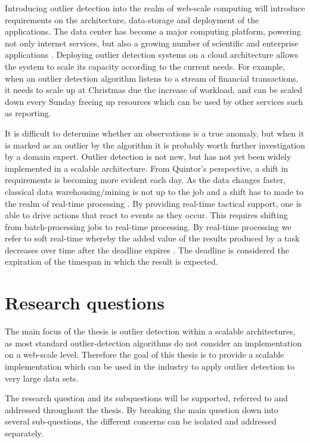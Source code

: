 Introducing outlier detection into the realm of web-scale computing will introduce requirements on the architecture, data-storage and deployment of the applications. The data center has become a major computing platform, powering not only internet services, but also a growing number of scientific and enterprise applications \cite{Zaharia:2011:DNO:2170444.2170461}. Deploying outlier detection systems on a cloud architecture allows the system to scale its capacity according to the current needs. For example, when an outlier detection algorithm listens to a stream of financial transactions, it needs to scale up at Christmas due the increase of workload, and can be scaled down every Sunday freeing up resources which can be used by other services such as reporting.

It is difficult to determine whether an observations is a true anomaly, but when it is marked as an outlier by the algorithm it is probably worth further investigation by a domain expert. Outlier detection is not new, but has not yet been widely implemented in a scalable architecture. From Quintor's perspective, a shift in requirements is becoming more evident each day. As the data changes faster, classical data warehousing/mining is not up to the job and a shift has to made to the realm of real-time processing \cite{1640284}. By providing real-time tactical support, one is able to drive actions that react to events as they occur. This requires shifting from batch-processing jobs to real-time processing. By real-time processing we refer to soft real-time whereby the added value of the results produced by a task decreases over time after the deadline expires \cite{259423}. The deadline is considered the expiration of the timespan in which the result is expected.

\section{Research questions \label{sec1-researchquestions}}

The main focus of the thesis is outlier detection within a scalable architectures, as most standard outlier-detection algorithms do not consider an implementation on a web-scale level. Therefore the goal of this thesis is to provide a scalable implementation which can be used in the industry to apply outlier detection to very large data sets.

The research question and its subquestions will be supported, referred to and addressed throughout the thesis. By breaking the main question down into several sub-questions, the different concerns can be isolated and addressed separately.

